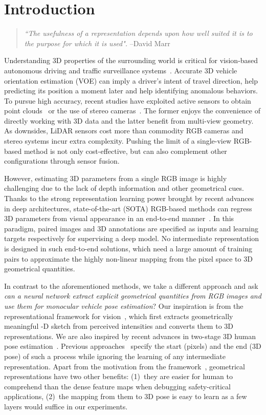 \documentclass[final]{cvpr}
\begin{document}
\section{Introduction}
\begin{quote}
\textit{``The usefulness of a representation depends upon how well suited it is to the purpose for which it is used".}
\hfill
--David Marr~\cite{marr2010vision}
\end{quote}
Understanding 3D properties of the surrounding world is critical for vision-based autonomous driving and traffic surveillance systems~\cite{ferryman2000visual}. Accurate 3D vehicle orientation estimation (VOE) can imply a driver's intent of travel direction, help predicting its position a moment later and help identifying anomalous behaviors. To pursue high accuracy, recent studies have exploited active sensors to obtain point clouds~\cite{yang2018pixor, zhou2018voxelnet, qi2019deep} or the use of stereo cameras~\cite{li2018stereo, sun2020disp, peng2020ida}. The former enjoys the convenience of directly working with 3D data and the latter benefit from multi-view geometry. As downsides, LiDAR sensors cost more than commodity RGB cameras and stereo systems incur extra complexity. Pushing the limit of a single-view RGB-based method is not only cost-effective, but can also complement other configurations through sensor fusion.  

However, estimating 3D parameters from a single RGB image is highly challenging due to the lack of depth information and other geometrical cues. Thanks to the strong representation learning power brought by recent advances in deep architectures, state-of-the-art (SOTA) RGB-based methods can regress 3D parameters from visual appearance in an end-to-end manner~\cite{mousavian20173d, brazil2019m3d, simonelli2019disentangling}. In this paradigm, paired images and 3D annotations are specified as inputs and learning targets respectively for supervising a deep model. No intermediate representation is designed in such end-to-end solutions, which need a large amount of training pairs to approximate the highly non-linear mapping from the pixel space to 3D geometrical quantities.

In contrast to the aforementioned methods, we take a different approach and ask \emph{can a neural network extract explicit geometrical quantities from RGB images and use them for monocular vehicle pose estimation}? Our inspiration is from the representational framework for vision~\cite{marr2010vision}, which first extracts geometrically meaningful -D sketch from perceived intensities and converts them to 3D representations. We are also inspired by recent advances in two-stage 3D human pose estimation~\cite{li2020cascaded}. Previous approaches~\cite{mousavian20173d, brazil2019m3d, simonelli2019disentangling} specify the start (pixels) and the end (3D pose) of such a process while ignoring the learning of any intermediate representation. Apart from the motivation from the framework~\cite{marr2010vision}, geometrical representations have two other benefits: (1)~they are easier for human to comprehend than the dense feature maps when debugging safety-critical applications, (2)~the mapping from them to 3D pose is easy to learn as a few layers would suffice in our experiments.   
\end{document}
